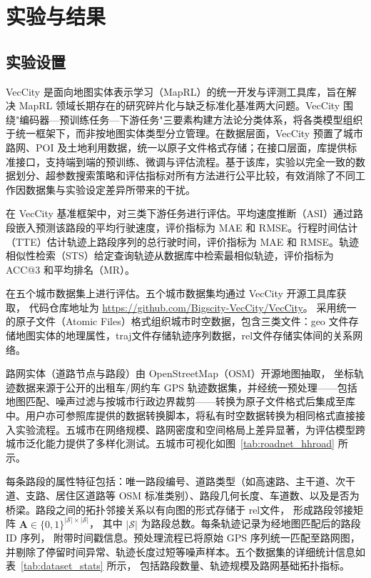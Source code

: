 \section{实验与结果}


\subsection{实验设置}

VecCity\cite{zhang2025veccity} 是面向地图实体表示学习（MapRL）的统一开发与评测工具库，旨在解决 MapRL 领域长期存在的研究碎片化与缺乏标准化基准两大问题。VecCity 围绕"编码器—预训练任务—下游任务"三要素构建方法论分类体系，将各类模型组织于统一框架下，而非按地图实体类型分立管理。在数据层面，VecCity 预置了城市路网、POI 及土地利用数据，统一以原子文件格式存储；在接口层面，库提供标准接口，支持端到端的预训练、微调与评估流程。基于该库，实验以完全一致的数据划分、超参数搜索策略和评估指标对所有方法进行公平比较，有效消除了不同工作因数据集与实验设定差异所带来的干扰。

在 VecCity 基准框架中，对三类下游任务进行评估。平均速度推断（ASI）通过路段嵌入预测该路段的平均行驶速度，评价指标为 MAE 和 RMSE。行程时间估计（TTE）估计轨迹上路段序列的总行驶时间，评价指标为 MAE 和 RMSE。轨迹相似性检索（STS）给定查询轨迹从数据库中检索最相似轨迹，评价指标为 ACC@3 和平均排名（MR）。

在五个城市数据集上进行评估。五个城市数据集均通过 VecCity 开源工具库\cite{zhang2025veccity}获取，
代码仓库地址为 \url{https://github.com/Bigscity-VecCity/VecCity}。
采用统一的原子文件（Atomic Files）格式组织城市时空数据，包含三类文件：geo 文件存储地图实体的地理属性，traj文件存储轨迹序列数据，rel文件存储实体间的关系网络。

路网实体（道路节点与路段）由 OpenStreetMap（OSM）开源地图抽取，
坐标轨迹数据来源于公开的出租车/网约车 GPS 轨迹数据集，并经统一预处理——包括地图匹配、噪声过滤与按城市行政边界裁剪——转换为原子文件格式后集成至库中。用户亦可参照库提供的数据转换脚本，将私有时空数据转换为相同格式直接接入实验流程。五城市在网络规模、路网密度和空间格局上差异显著，为评估模型跨城市泛化能力提供了多样化测试。五城市可视化如图~\ref{tab:roadnet_hhroad} 所示。

每条路段的属性特征包括：唯一路段编号、道路类型（如高速路、主干道、次干道、支路、居住区道路等 OSM 标准类别）、路段几何长度、车道数、以及是否为桥梁。路段之间的拓扑邻接关系以有向图的形式存储于 rel文件，
形成路段邻接矩阵 $\mathbf{A} \in \{0,1\}^{|\mathcal{S}| \times |\mathcal{S}|}$，
其中 $|\mathcal{S}|$ 为路段总数。每条轨迹记录为经地图匹配后的路段 ID 序列，
附带时间戳信息。预处理流程已将原始 GPS 序列统一匹配至路网图，
并剔除了停留时间异常、轨迹长度过短等噪声样本。五个数据集的详细统计信息如表~\ref{tab:dataset_stats} 所示，
包括路段数量、轨迹规模及路网基础拓扑指标。

